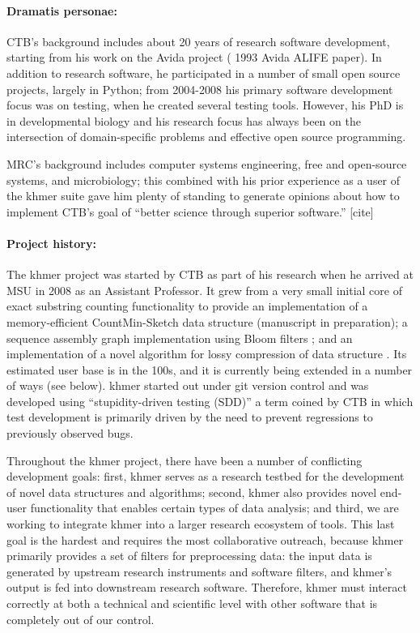 \documentclass[11pt]{article}
\begin{document}
\paragraph{Dramatis personae:}
CTB's background includes about 20 years of research software
development, starting from his work on the Avida project (\cite{wiki:avida} 1993 Avida ALIFE paper).  In addition to research software, he
participated in a number of small open source projects, largely in
Python; from 2004-2008 his primary software development focus was on
testing, when he created several testing tools.  However, his PhD is
in developmental biology and his research focus has always been on the
intersection of domain-specific problems and effective open source
programming.

MRC's background includes computer systems engineering, free and
open-source systems, and microbiology; this combined with his prior
experience as a user of the khmer suite gave him plenty of standing to
generate opinions about how to implement CTB's goal of ``better
science through superior software.''  [cite]

\paragraph{Project history:}
The khmer project was started by CTB as part of his research when he
arrived at MSU in 2008 as an Assistant Professor.  It grew from a very
small initial core of exact substring counting functionality to
provide an implementation of a memory-efficient CountMin-Sketch data
structure (manuscript in preparation); a sequence assembly graph
implementation using Bloom filters \cite{kmer-percolation}; and an
implementation of a novel algorithm for lossy compression of data
structure \cite{diginorm}.  Its estimated user base is in the 100s,
and it is currently being extended in a number of ways (see below).
khmer started out under git version control and was developed using
``stupidity-driven testing (SDD)'' a term coined by CTB in which test
development is primarily driven by the need to prevent regressions to
previously observed bugs.

Throughout the khmer project, there have been a number of conflicting
development goals: first, khmer serves as a research testbed for the
development of novel data structures and algorithms; second, khmer
also provides novel end-user functionality that enables certain types
of data analysis; and third, we are working to integrate khmer into a
larger research ecosystem of tools.  This last goal is the hardest
and requires the most collaborative outreach, because khmer
primarily provides a set of filters for preprocessing data: the input
data is generated by upstream research instruments and software
filters, and khmer's output is fed into downstream research software.
Therefore, khmer must interact correctly at both a technical and
scientific level with other software that is completely out of our
control.
\end{document}
